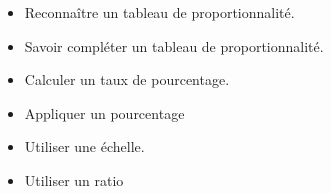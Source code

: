 \begin{myobj}
	
	\begin{itemize}
		\item Reconnaître un tableau de proportionnalité.
		\item Savoir compléter un tableau de proportionnalité.
		\item Calculer un taux de pourcentage.
		\item Appliquer un pourcentage
		\item Utiliser une échelle.
		\item Utiliser un ratio
	\end{itemize}
\end{myobj}



%


